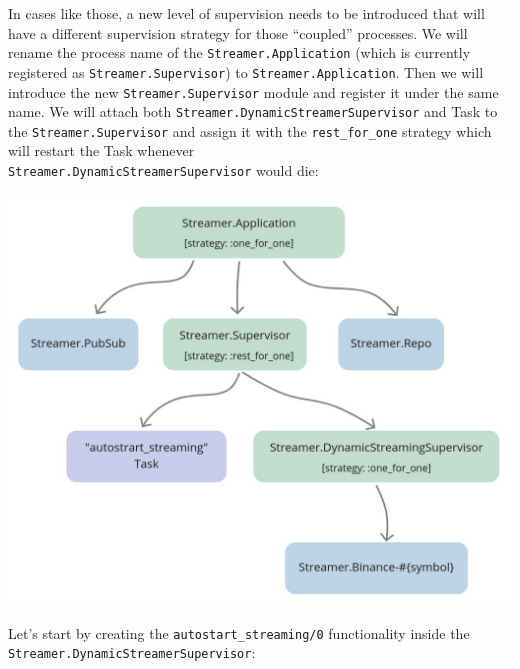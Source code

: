 \documentclass[
  oneside]{book}
\begin{document}
In cases like those, a new level of supervision needs to be introduced that will have a different supervision strategy for those ``coupled'' processes. We will rename the process name of the \texttt{Streamer.Application} (which is currently registered as \texttt{Streamer.Supervisor}) to \texttt{Streamer.Application}. Then we will introduce the new \texttt{Streamer.Supervisor} module and register it under the same name. We will attach both \texttt{Streamer.DynamicStreamerSupervisor} and Task to the \texttt{Streamer.Supervisor} and assign it with the \texttt{rest\_for\_one} strategy which will restart the Task whenever\\
\texttt{Streamer.DynamicStreamerSupervisor} would die:

\begin{center}\includegraphics[width=1\linewidth,height=0.5\textheight]{images/chapter_11_04_new_sup_tree} \end{center}

Let's start by creating the \texttt{autostart\_streaming/0} functionality inside the\\
\texttt{Streamer.DynamicStreamerSupervisor}:
\end{document}
